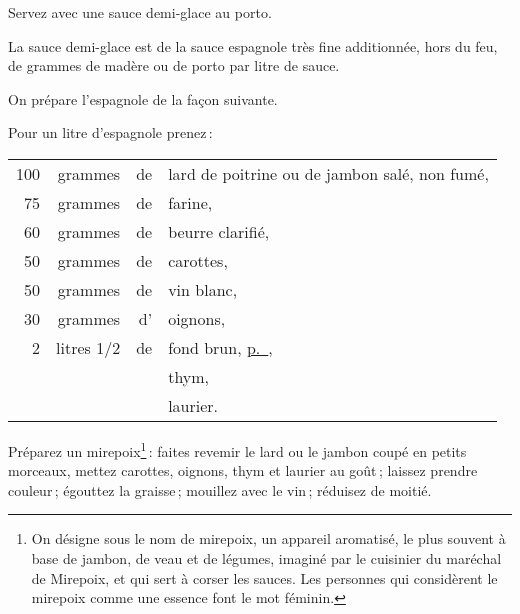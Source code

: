 Servez avec une sauce demi-glace au porto.

\sk

\label{pg0456} \hypertarget{p0456}{}
La sauce demi-glace est de la sauce espagnole très fine additionnée, hors du
feu, de {\mmm} grammes de madère ou de porto par litre de sauce.

\sk

On prépare l’espagnole de la façon suivante.

\medskip

Pour un litre d'espagnole prenez :

\medskip

\footnotesize
\begin{longtable}{rrrp{16em}}
    100 & grammes & de & lard de poitrine ou de jambon salé, non fumé,                                    \\
     75 & grammes & de & farine,                                                                          \\
     60 & grammes & de & beurre clarifié,                                                                 \\
     50 & grammes & de & carottes,                                                                        \\
     50 & grammes & de & vin blanc,                                                                       \\
     30 & grammes & d' & oignons,                                                                         \\
  2  & litres 1/2 & de & fond brun, \hyperlink{p0203}{p. \pageref{pg0203}},                               \\
        &         &    & thym,                                                                            \\
        &         &    & laurier.                                                                         \\
\end{longtable}
\normalsize

Préparez un mirepoix\footnote{
On désigne sous le nom de mirepoix, un appareil
aromatisé, le plus souvent à base de jambon, de veau et de légumes, imaginé par
le cuisinier du maréchal de Mirepoix, et qui sert à corser les sauces. Les
personnes qui considèrent le mirepoix comme une essence font le mot féminin.} :
faites revemir le lard ou le jambon coupé en petits morceaux, mettez carottes,
oignons, thym et laurier au goût ; laissez prendre couleur ; égouttez la
graisse ; mouillez avec le vin ; réduisez de moitié.

